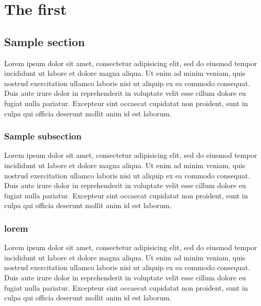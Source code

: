 
\chapter{The first}

\section{Sample section}

Lorem ipsum dolor sit amet, consectetur adipisicing elit, sed do eiusmod
tempor incididunt ut labore et dolore magna aliqua. Ut enim ad minim veniam,
quis nostrud exercitation ullamco laboris nisi ut aliquip ex ea commodo
consequat. Duis aute irure dolor in reprehenderit in voluptate velit esse
cillum dolore eu fugiat nulla pariatur. Excepteur sint occaecat cupidatat non
proident, sunt in culpa qui officia deserunt mollit anim id est laborum.


\subsection{Sample subsection}

Lorem ipsum dolor sit amet, consectetur adipisicing elit, sed do eiusmod
tempor incididunt ut labore et dolore magna aliqua. Ut enim ad minim veniam,
quis nostrud exercitation ullamco laboris nisi ut aliquip ex ea commodo
consequat. Duis aute irure dolor in reprehenderit in voluptate velit esse
cillum dolore eu fugiat nulla pariatur. Excepteur sint occaecat cupidatat non
proident, sunt in culpa qui officia deserunt mollit anim id est laborum.

\subsection{lorem}

Lorem ipsum dolor sit amet, consectetur adipisicing elit, sed do eiusmod
tempor incididunt ut labore et dolore magna aliqua. Ut enim ad minim veniam,
quis nostrud exercitation ullamco laboris nisi ut aliquip ex ea commodo
consequat. Duis aute irure dolor in reprehenderit in voluptate velit esse
cillum dolore eu fugiat nulla pariatur. Excepteur sint occaecat cupidatat non
proident, sunt in culpa qui officia deserunt mollit anim id est laborum.

